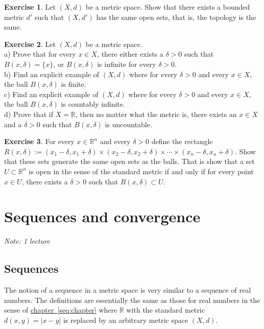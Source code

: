 \documentclass[12pt]{book}
\newcommand{\abs}[1]{\left\lvert {#1} \right\rvert}
\newcommand{\R}{{\mathbb{R}}}
\newcommand{\sectionnotes}[1]{\noindent \emph{Note: #1} \medskip \par}
\newcommand{\sectionnewpage}{\clearpage}
\theoremstyle{plain}
\theoremstyle{remark}
\theoremstyle{definition}
\theoremstyle{exercise}
\newtheorem{exercise}{Exercise}[section]
\theoremstyle{example}
\newcommand{\chapterref}[1]{\hyperref[#1]{chapter~\ref*{#1}}}
\begin{document}
\begin{exercise}
Let $(X,d)$ be a metric space.  Show that there exists a bounded metric
$d'$ such that $(X,d')$ has the same open sets, that is, the topology is
the same.
\end{exercise}

\begin{exercise}
Let $(X,d)$ be a metric space.\\
a) Prove that for every $x \in X$, there either exists a $\delta > 0$ such that
$B(x,\delta) = \{ x \}$, or $B(x,\delta)$ is infinite for every $\delta >  0$.
\\
b) Find an explicit example of $(X,d)$ where for every $\delta > 0$ and
every $x \in X$, the
ball $B(x,\delta)$ is finite.
\\
c) Find an explicit example of $(X,d)$ where for every $\delta > 0$ and
every $x \in X$, the
ball $B(x,\delta)$ is countably infinite.
\\
d) Prove that if $X = \R$, then no matter what the metric is, there exists
an $x \in X$ and a $\delta > 0$ such that $B(x,\delta)$ is uncountable.
\end{exercise}

\begin{exercise}
For every $x \in \R^n$ and every $\delta > 0$ define the rectangle
$R(x,\delta) :=
(x_1-\delta,x_1+\delta) \times
(x_2-\delta,x_2+\delta) \times \cdots \times
(x_n-\delta,x_n+\delta)$.  Show that these sets generate the same open
sets as the balls.  That is show that a set $U \subset \R^n$
is open in the sense of the standard metric if and only if for every
point $x \in U$, there exists a $\delta > 0$ such that $R(x,\delta) \subset
U$.
\end{exercise}


\sectionnewpage
\section{Sequences and convergence}
\label{sec:metseqs}

\sectionnotes{1 lecture}

\subsection{Sequences}

The notion of a sequence in a metric space is very similar to a sequence of
real numbers.
The definitions are essentially the same as those for real numbers
in the sense of \chapterref{seq:chapter} where $\R$ with
the standard metric $d(x,y)=\abs{x-y}$ is replaced
by an arbitrary metric space $(X,d)$.
\end{document}
